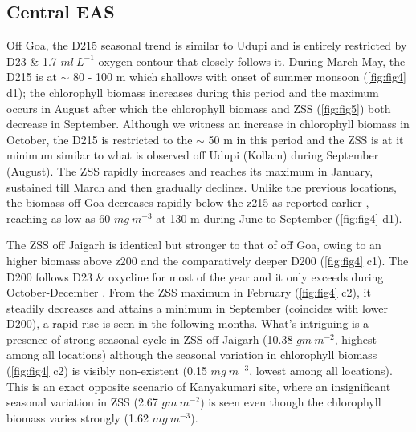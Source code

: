 \documentclass{article}
\begin{document}
	\subsection{Central EAS}
	Off Goa, the D215 seasonal trend is similar to Udupi and is entirely restricted by D23 \& 1.7 $ml \ L^{-1}$ oxygen contour that closely follows it. During March-May, the D215 is at $\sim$ 80 - 100 m which shallows with onset of summer monsoon (\cref{fig:fig4} d1); the chlorophyll biomass increases during this period and the maximum occurs in August after which the chlorophyll biomass and ZSS (\cref{fig:fig5}) both decrease in September. Although we witness an increase in chlorophyll biomass in October, the D215 is restricted to the $\sim$ 50 m in this period  and the ZSS is at it minimum  similar to what is observed off Udupi (Kollam) during September (August). The ZSS rapidly increases and reaches its maximum in January, sustained till March and then gradually declines. Unlike the previous locations, the biomass off Goa decreases rapidly below the z215 as reported earlier \citep{aparna2022seasonal}, reaching as low as 60 $mg \ m^{-3}$ at 130 m during June to September (\cref{fig:fig4} d1).
	 

	
	The ZSS off Jaigarh is identical but stronger to that of off Goa, owing to an higher biomass above z200 and the comparatively deeper D200 (\cref{fig:fig4} c1). The D200 follows D23 \& oxycline for most of the year and it only exceeds during October-December .  From the ZSS maximum in February (\cref{fig:fig4} c2), it steadily decreases and attains a minimum in September (coincides with lower D200), a rapid rise is seen in the following months. What's intriguing is a presence of strong seasonal cycle in ZSS off Jaigarh (10.38 $gm\ m^{-2}$, highest among all locations) although the seasonal variation in chlorophyll biomass (\cref{fig:fig4} c2) is visibly non-existent (0.15 $mg\ m^{-3}$, lowest among all locations). This is an exact opposite scenario of Kanyakumari site, where an insignificant seasonal variation in ZSS (2.67 $gm\ m^{-2}$) is seen even though the chlorophyll biomass varies strongly (1.62 $mg\ m^{-3}$). 
		
\end{document}

